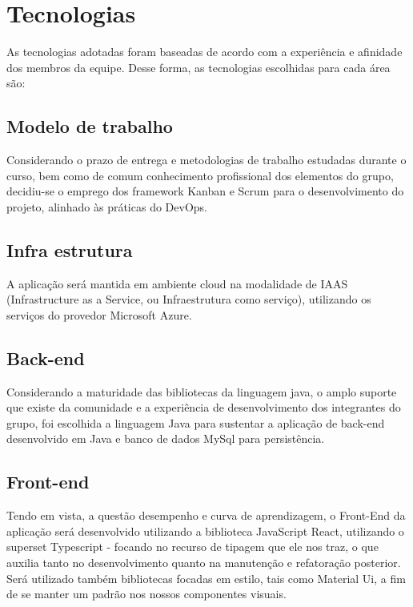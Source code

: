 \chapter[Tecnologias]{Tecnologias}
As tecnologias adotadas foram baseadas de acordo com a experiência e afinidade dos membros da equipe. Desse forma, as tecnologias escolhidas para cada área são:
	\section{Modelo de trabalho}
	
	Considerando o prazo de entrega e metodologias de trabalho estudadas durante o curso, bem como de comum conhecimento profissional dos elementos do grupo, decidiu-se o emprego dos framework Kanban e Scrum para o desenvolvimento do projeto, alinhado {\`a}s práticas do DevOps.

	\section{Infra estrutura}
	
	A aplica{\c{c}}ão será mantida em ambiente cloud na modalidade de IAAS (Infrastructure as a Service, ou Infraestrutura como servi{\c{c}}o), utilizando os servi{\c{c}}os do provedor Microsoft Azure.
	
	\section{Back-end}
	
	Considerando a maturidade das bibliotecas da linguagem java, o amplo suporte que existe da comunidade e a experiência de desenvolvimento dos integrantes do grupo, foi escolhida a linguagem Java para sustentar a aplica{\c{c}}ão de back-end desenvolvido em Java e banco de dados MySql para persistência.
	
	\section{Front-end}
	
	Tendo em vista, a questão desempenho e curva de aprendizagem, o Front-End da aplicação será desenvolvido utilizando a biblioteca JavaScript React, utilizando o superset Typescript - focando no recurso de tipagem que ele nos traz, o que auxilia tanto no desenvolvimento quanto na manutenção e refatoração posterior. Será utilizado também bibliotecas focadas em estilo, tais como Material Ui, a fim de se manter um padrão nos nossos componentes visuais. 